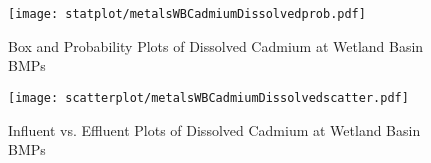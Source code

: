         \begin{figure}[hb]   %
            \centering
            \texttt{[image: statplot/metalsWBCadmiumDissolvedprob.pdf]}
            \caption{Box and Probability Plots of Dissolved Cadmium at Wetland Basin BMPs}
        \end{figure}         %
        
        
        \begin{figure}[hb]   %
            \centering
            \texttt{[image: scatterplot/metalsWBCadmiumDissolvedscatter.pdf]}
            \caption{Influent vs. Effluent Plots of Dissolved Cadmium at Wetland Basin BMPs}
        \end{figure}         %
        \clearpage
        